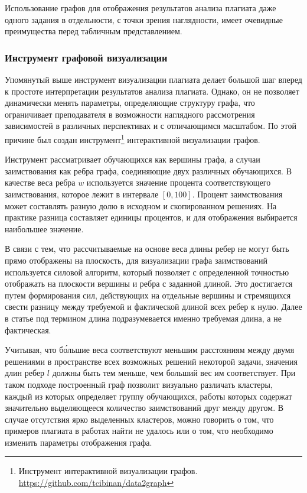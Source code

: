 \documentclass[a4paper,14pt]{extarticle}
\begin{document}
Использование графов для отображения результатов анализа плагиата даже одного задания в отдельности, с точки зрения наглядности, имеет очевидные преимущества перед табличным представлением.

\subsubsection{Инструмент графовой визуализации}

Упомянутый выше инструмент визуализации плагиата делает большой шаг вперед к простоте интерпретации результатов анализа плагиата. Однако, он не позволяет динамически менять параметры, определяющие структуру графа, что ограничивает преподавателя в возможности наглядного рассмотрения зависимостей в различных перспективах и с отличающимся масштабом. По этой причине был создан инструмент\footnote{Инструмент интерактивной визуализации графов. \url{https://github.com/tcibinan/data2graph}} интерактивной визуализации графов.

Инструмент рассматривает обучающихся как вершины графа, а случаи заимствования как ребра графа, соединяющие двух различных обучающихся. В качестве веса ребра $w$ используется значение процента соответствующего заимствования, которое лежит в интервале $[0,100]$. Процент заимствования может составлять разную долю в исходном и скопированном решениях. На практике разница составляет единицы процентов, и для отображения выбирается наибольшее значение.

В связи с тем, что рассчитываемые на основе веса длины ребер не могут быть прямо отображены на плоскость, для визуализации графа заимствований используется силовой алгоритм, который позволяет с определенной точностью отображать на плоскости вершины и ребра с заданной длиной. Это достигается путем формирования сил, действующих на отдельные вершины и стремящихся свести разницу между требуемой и фактической длиной всех ребер к нулю. Далее в статье под термином длина подразумевается именно требуемая длина, а не фактическая.

Учитывая, что б\'{о}льшие веса соответствуют меньшим расстояниям между двумя решениями в пространстве всех возможных решений некоторой задачи, значения длин ребер $l$ должны быть тем меньше, чем больший вес им соответствует. При таком подходе построенный граф позволит визуально различать кластеры, каждый из которых определяет группу обучающихся, работы которых содержат значительно выделяющееся количество заимствований друг между другом. В случае отсутствия ярко выделенных кластеров, можно говорить о том, что примеров плагиата в работах найти не удалось или о том, что необходимо изменить параметры отображения графа.
\end{document}
